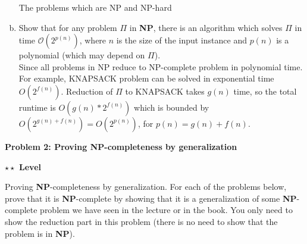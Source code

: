 \documentclass{article}\usepackage[utf8]{inputenc}\usepackage[margin=0.4cm,top=0.4cm,bottom=0.4cm]{geometry}\usepackage[usenames,dvipsnames,svgnames,table]{xcolor}
\begin{document}
\begin{enumerate}[a.]
The problems which are NP and NP-hard
\EndSolution
\item Show that for any problem $\Pi$ in \textbf{NP}, there is an algorithm which solves $\Pi$ in time $\mathcal{O}{(2^{p(n)})}$, where $n$ is the size of the input instance and $p(n)$ is a polynomial (which may depend on $\Pi$).
\BeginSolution %
\\
Since all problems in NP reduce to NP-complete problem in polynomial time. For example, KNAPSACK problem can be solved in exponential time $O(2^{f(n)})$. Reduction of $\Pi$ to KNAPSACK takes $g(n)$ time, so the total runtime is $O(g(n) * 2^{f(n)})$ which is bounded by $O(2^{g(n) + f(n)}) = O(2^{p(n)})$, for $p(n) = g(n) + f(n)$.
\EndSolution
\end{enumerate}
\clearpage

\vspace{-2mm}\noindent\begin{mybox}{\begin{center}\textbf{\color{black}Problem 2: Proving NP-completeness by generalization}\end{center}}\end{mybox}\vspace{-2mm}
\begin{myboxot}\noindent\textbf{$\star\star$ Level}\end{myboxot} 

\noindent Proving \textbf{NP}-completeness by generalization. For each of the problems below, prove that it is \textbf{NP}-complete by showing that it is a generalization of some \textbf{NP}-complete problem we have seen in the lecture or in the book. You only need to show the reduction part in this problem (there is no need to show that the problem is in \textbf{NP}).
\end{document}
